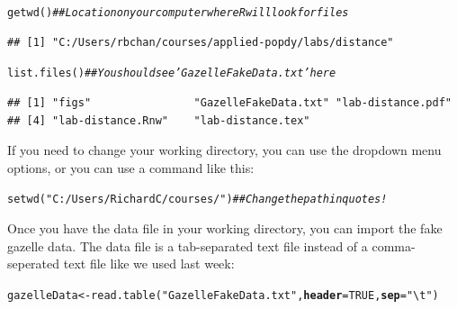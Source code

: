 \documentclass[12pt]{article}\usepackage[]{graphicx}\usepackage[]{color}
\makeatletter
\newcommand{\hlnum}[1]{\textcolor[rgb]{0.69,0.494,0}{#1}}%
\newcommand{\hlstr}[1]{\textcolor[rgb]{0.749,0.012,0.012}{#1}}%
\newcommand{\hlcom}[1]{\textcolor[rgb]{0.514,0.506,0.514}{\textit{#1}}}%
\newcommand{\hlstd}[1]{\textcolor[rgb]{0,0,0}{#1}}%
\newcommand{\hlkwb}[1]{\textcolor[rgb]{0,0.341,0.682}{#1}}%
\newcommand{\hlkwc}[1]{\textcolor[rgb]{0,0,0}{\textbf{#1}}}%
\newcommand{\hlkwd}[1]{\textcolor[rgb]{0.004,0.004,0.506}{#1}}%
\newenvironment{kframe}{%
 \def\at@end@of@kframe{}%
 \ifinner\ifhmode%
  \def\at@end@of@kframe{\end{minipage}}%
  \begin{minipage}{\columnwidth}%
 \fi\fi%
 \def\FrameCommand##1{\hskip\@totalleftmargin \hskip-\fboxsep
 \colorbox{shadecolor}{##1}\hskip-\fboxsep
     \hskip-\linewidth \hskip-\@totalleftmargin \hskip\columnwidth}%
 \MakeFramed {\advance\hsize-\width
   \@totalleftmargin\z@ \linewidth\hsize
   \@setminipage}}%
 {\par\unskip\endMakeFramed%
 \at@end@of@kframe}
\newenvironment{knitrout}{}{} %
\makeatother
\begin{document}
\begin{knitrout}
\color{fgcolor}\begin{kframe}
\begin{alltt}
\hlkwd{getwd}\hlstd{()}       \hlcom{## Location on your computer where R will look for files}
\end{alltt}
\begin{verbatim}
## [1] "C:/Users/rbchan/courses/applied-popdy/labs/distance"
\end{verbatim}
\begin{alltt}
\hlkwd{list.files}\hlstd{()}  \hlcom{## You should see 'GazelleFakeData.txt' here}
\end{alltt}
\begin{verbatim}
## [1] "figs"                "GazelleFakeData.txt" "lab-distance.pdf"   
## [4] "lab-distance.Rnw"    "lab-distance.tex"
\end{verbatim}
\end{kframe}
\end{knitrout}

If you need to change your working directory, you can use the dropdown
menu options, or you can use a command like this:

\begin{knitrout}
\color{fgcolor}\begin{kframe}
\begin{alltt}
\hlkwd{setwd}\hlstd{(}\hlstr{"C:/Users/RichardC/courses/"}\hlstd{)} \hlcom{## Change the path in quotes!}
\end{alltt}
\end{kframe}
\end{knitrout}

Once you have the data file in your working directory, you can import
the fake gazelle data. The data file is a tab-separated text file
instead of a comma-seperated text file like we used last week:

\begin{knitrout}
\color{fgcolor}\begin{kframe}
\begin{alltt}
\hlstd{gazelleData} \hlkwb{<-} \hlkwd{read.table}\hlstd{(}\hlstr{"GazelleFakeData.txt"}\hlstd{,} \hlkwc{header}\hlstd{=}\hlnum{TRUE}\hlstd{,} \hlkwc{sep}\hlstd{=}\hlstr{"\textbackslash{}t"}\hlstd{)}
\end{alltt}
\end{kframe}
\end{knitrout}
\end{document}

